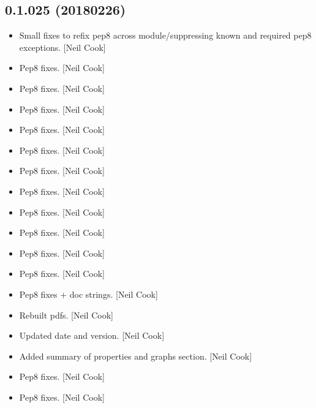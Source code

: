 \documentclass[a4paper,10pt,english]{report}
\begin{document}
\subsection{0.1.025 (2018\sphinxhyphen{}02\sphinxhyphen{}26)}
\label{\detokenize{misc/changelog:id498}}\begin{itemize}
\item {} 
Small fixes to refix pep8 across module/suppressing known and required
pep8 exceptions. {[}Neil Cook{]}

\item {} 
Pep8 fixes. {[}Neil Cook{]}

\item {} 
Pep8 fixes. {[}Neil Cook{]}

\item {} 
Pep8 fixes. {[}Neil Cook{]}

\item {} 
Pep8 fixes. {[}Neil Cook{]}

\item {} 
Pep8 fixes. {[}Neil Cook{]}

\item {} 
Pep8 fixes. {[}Neil Cook{]}

\item {} 
Pep8 fixes. {[}Neil Cook{]}

\item {} 
Pep8 fixes. {[}Neil Cook{]}

\item {} 
Pep8 fixes. {[}Neil Cook{]}

\item {} 
Pep8 fixes. {[}Neil Cook{]}

\item {} 
Pep8 fixes. {[}Neil Cook{]}

\item {} 
Pep8 fixes + doc strings. {[}Neil Cook{]}

\item {} 
Rebuilt pdfs. {[}Neil Cook{]}

\item {} 
Updated date and version. {[}Neil Cook{]}

\item {} 
Added summary of properties and graphs section. {[}Neil Cook{]}

\item {} 
Pep8 fixes. {[}Neil Cook{]}

\item {} 
Pep8 fixes. {[}Neil Cook{]}


\end{itemize}
\end{document}

